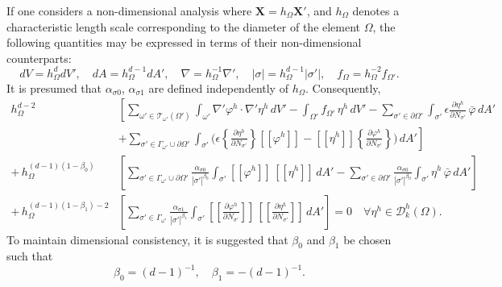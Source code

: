 	If one considers a non-dimensional analysis where $\mathbf{X} = h_\Omega \mathbf{X}'$, and $h_\Omega$ denotes a characteristic length scale corresponding to the diameter of the element $\Omega$, the following quantities may be expressed in terms of their non-dimensional counterparts:
    \begin{equation}
        dV = h_\Omega^d dV', \quad dA = h_\Omega^{d-1} dA', \quad \nabla = h_\Omega^{-1} \nabla', \quad |\sigma| = h_\Omega^{d-1} |\sigma'|, \quad f_{\Omega} = h_\Omega^{-2} f_{\Omega'}.
    \end{equation}
    It is presumed that $\alpha_{\sigma0}$, $\alpha_{\sigma1}$ are defined independently of $h_\Omega$. Consequently,
    \begin{align}
		h_\Omega^{d-2} & \left[ \sum_{\omega' \in \mathcal{T}_{\omega'} (\Omega')} \int_{\omega'} \nabla' \varphi^h \cdot \nabla' \eta^h \, dV' - \int_{\Omega'} f_{\Omega'} \, \eta^h \, dV' - \sum_{\sigma' \in \partial \Omega'} \int_{\sigma'} \epsilon \frac{\partial \eta^h}{\partial N_{\sigma'}} \, \bar{\varphi} \, dA' \right. \nonumber \\ 
		& \left. + \sum_{\sigma' \in \Gamma_{\omega'} \cup \partial \Omega'} \int_{\sigma'} \bigg( \epsilon \left\{ \frac{\partial \eta^h}{\partial N_{\sigma'}} \right\} [\![ \varphi^h ]\!] - [\![ \eta^h ]\!] \left\{ \frac{\partial \varphi^h}{\partial N_{\sigma'}} \right\} \bigg) \, dA' \right] \nonumber \\ 
		+ \, h_\Omega^{(d-1)(1-\beta_0)} & \left[ \sum_{\sigma' \in \Gamma_{\omega'} \cup \partial \Omega'} \frac{\alpha_{\sigma0}}{|\sigma'|^{\beta_0}} \int_{\sigma'} [\![ \varphi^h ]\!] \, [\![ \eta^h ]\!] \, dA' - \sum_{\sigma' \in \partial \Omega'} \frac{\alpha_{\sigma0}}{|\sigma'|^{\beta_0}} \int_{\sigma'} \eta^h \, \bar{\varphi} \, dA' \right] \nonumber \\ 
		+ \, h_\Omega^{(d-1)(1-\beta_1)-2} & \left[ \sum_{\sigma' \in \Gamma_{\omega'}} \frac{\alpha_{\sigma1}}{|\sigma'|^{\beta_1}} \int_{\sigma'} \left[\!\!\left[ \frac{\partial \varphi^h}{\partial N_{\sigma'}} \right]\!\!\right] \, \left[\!\!\left[ \frac{\partial \eta^h}{\partial N_{\sigma'}} \right]\!\!\right] \, dA' \right] = 0 \quad \forall \eta^h \in \mathcal{D}^h_k (\Omega). 
		\label{eq:dg_nondim}
	\end{align}
	To maintain dimensional consistency, it is suggested that $\beta_0$ and $\beta_1$ be chosen such that
	\begin{equation}
		\beta_0 = (d-1)^{-1}, \quad \beta_1 = -(d-1)^{-1}.
	\end{equation}
	
